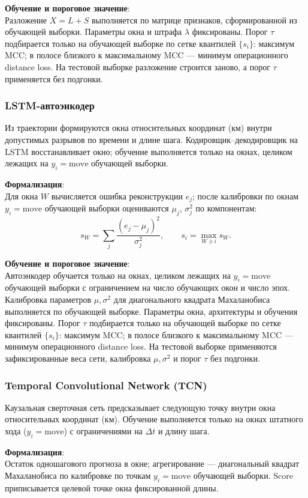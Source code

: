 \documentclass[a4paper,12pt]{report}
\begin{document}
	\textbf{Обучение и пороговое значение}:\\
	Разложение $X=L+S$ выполняется по матрице признаков, сформированной из обучающей выборки. Параметры окна и штрафа $\lambda$ фиксированы. Порог $\tau$ подбирается только на обучающей выборке по сетке квантилей $\{s_i\}$: максимум MCC; в полосе близкого к максимальному MCC — минимум операционного distance loss. На тестовой выборке разложение строится заново, а порог $\tau$ применяется без подгонки.


	\subsubsection{LSTM-автоэнкодер}
	Из траектории формируются окна относительных координат (км) внутри допустимых разрывов по времени и длине шага. Кодировщик--декодировщик на LSTM восстанавливает окно; обучение выполняется только на окнах, целиком лежащих на $y_i=\mathrm{move}$ обучающей выборки.

	\textbf{Формализация}:\\
	Для окна $W$ вычисляется ошибка реконструкции $e_j$; после калибровки по окнам $y_i=\mathrm{move}$ обучающей выборки оцениваются $\mu_j$, $\sigma_j^2$ по компонентам:
	$$s_W=\sum_j \frac{(e_j-\mu_j)^2}{\sigma_j^2}, \qquad s_i=\max_{W\ni i} s_W.$$

	\textbf{Обучение и пороговое значение}:\\
	Автоэнкодер обучается только на окнах, целиком лежащих на $y_i=\mathrm{move}$ обучающей выборки с ограничением на число обучающих окон и число эпох. Калибровка параметров $\mu,\sigma^2$ для диагонального квадрата Махаланобиса выполняется по обучающей выборке. Параметры окна, архитектуры и обучения фиксированы. Порог $\tau$ подбирается только на обучающей выборке по сетке квантилей $\{s_i\}$: максимум MCC; в полосе близкого к максимальному MCC --- минимум операционного distance loss. На тестовой выборке применяются зафиксированные веса сети, калибровка $\mu,\sigma^2$ и порог $\tau$ без подгонки.

	\subsubsection{Temporal Convolutional Network (TCN)}
	Каузальная сверточная сеть предсказывает следующую точку внутри окна относительных координат (км). Обучение выполняется только на окнах штатного хода ($y_i=\mathrm{move}$) с ограничениями на $\Delta t$ и длину шага.

	\textbf{Формализация}:\\
	Остаток одношагового прогноза в окне; агрегирование --- диагональный квадрат Махаланобиса по калибровке по точкам $y_i=\mathrm{move}$ обучающей выборки. Score приписывается целевой точке окна фиксированной длины.
\end{document}
